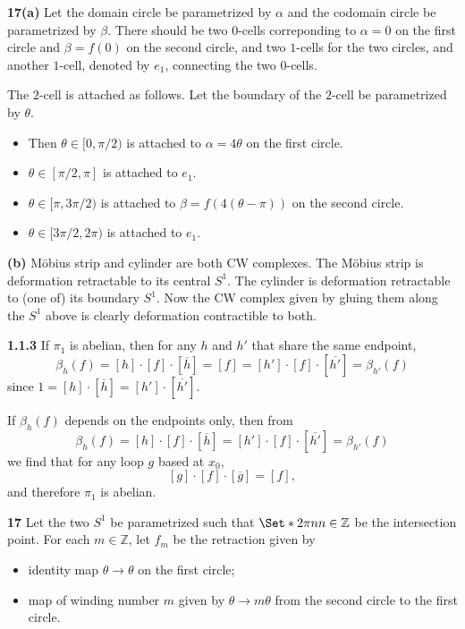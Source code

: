 \documentclass{article}
\makeatletter
\newcommand*{\shifttext}[1]{%
  \settowidth{\@tempdima}{#1}%
  \hspace{-\@tempdima}#1%
}
\newcommand{\plabel}[1]{%
\shifttext{\textbf{#1}\quad}%
}
\newcommand{\prule}{%
\begin{center}%
\hdashrule[0.5ex]{.99\linewidth}{1pt}{1pt 2.5pt}%
\end{center}%
}
\makeatother
\begin{document}
\plabel{17(a)}%
Let the domain circle be parametrized by $\alpha$ and the codomain circle be parametrized by $\beta$.
There should be two $0$-cells correponding to $\alpha=0$ on the first circle and $\beta = f(0)$ on the second circle, and two $1$-cells for the two circles, and another $1$-cell, denoted by $e_1$, connecting the two $0$-cells.
\par
The $2$-cell is attached as follows.
Let the boundary of the $2$-cell be parametrized by $\theta$.
\begin{itemize}
    \item Then $\theta\in [0,\pi/2)$ is attached to $\alpha = 4\theta$ on the first circle.
    \item $\theta\in [\pi/2, \pi]$ is attached to $e_1$.
    \item $\theta \in [\pi, 3\pi/2)$ is attached to $\beta = f(4(\theta - \pi))$ on the second circle.
    \item $\theta \in [3\pi/2,2\pi)$ is attached to $e_1$.
\end{itemize}

\plabel{(b)}%
M\"obius strip and cylinder are both CW complexes.
The M\"obius strip is deformation retractable to its central $S^1$.
The cylinder is deformation retractable to (one of) its boundary $S^1$.
Now the CW complex given by gluing them along the $S^1$ above is clearly deformation contractible to both.

\prule

\plabel{1.1.3}%
If $\pi_1$ is abelian, then for any $h$ and $h'$ that share the same endpoint,
\[ \beta_h(f) = [h] \cdot [f] \cdot [\overline{h}] = [f] = [h'] \cdot [f] \cdot [\overline{h'}] = \beta_{h'}(f) \]
since $1 = [h] \cdot [\overline{h}] = [h'] \cdot [\overline{h'}]$.
\par
If $\beta_h(f)$ depends on the endpoints only, then from
\[ \beta_h(f) = [h] \cdot [f] \cdot [\overline{h}] = [h'] \cdot [f] \cdot [\overline{h'}] = \beta_{h'}(f) \]
we find that for any loop $g$ based at $x_0$,
\[ [g] \cdot [f] \cdot [\overline{g}] = [f], \]
and therefore $\pi_1$ is abelian.

\plabel{17}%
Let the two $S^1$ be parametrized such that $\Set*{2\pi n}{n\in\mathbb{Z}}$ be the intersection point.
For each $m\in \mathbb{Z}$, let $f_m$ be the retraction given by
\begin{itemize}
    \item identity map $\theta \rightarrow \theta$ on the first circle;
    \item map of winding number $m$ given by $\theta \rightarrow m\theta$ from the second circle to the first circle.
\end{itemize}
\end{document}
